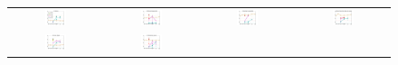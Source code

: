 \documentclass{article}
\begin{document}
\begin{figure}[htbp!]
\begin{tabular}{@{}c@{}c@{}c@{}c@{}}
\includegraphics[width=0.25\textwidth, trim=20mm 7mm 15mm 3mm, clip]{ppfigdim_f001}&
\includegraphics[width=0.25\textwidth, trim=20mm 7mm 15mm 3mm, clip]{ppfigdim_f002}&
\includegraphics[width=0.25\textwidth, trim=20mm 7mm 15mm 3mm, clip]{ppfigdim_f003}&
\includegraphics[width=0.25\textwidth, trim=20mm 7mm 15mm 3mm, clip]{ppfigdim_f004}\\
\includegraphics[width=0.25\textwidth, trim=20mm 7mm 15mm 3mm, clip]{ppfigdim_f005}&
\includegraphics[width=0.25\textwidth, trim=20mm 7mm 15mm 3mm, clip]{ppfigdim_f006}&

\end{tabular}
\end{figure}
\end{document}
